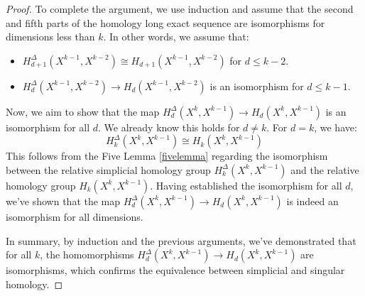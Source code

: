 \begin{proof}
To complete the argument, we use induction and assume that the second and fifth parts of the homology long exact sequence are isomorphisms for dimensions less than $k$. In other words, we assume that:
\begin{itemize}
	\item $H_{d+1}^\Delta(X^{k-1}, X^{k-2}) \cong H_{d+1}(X^{k-1}, X^{k-2})$ for $d \leq k-2$.
	\item $H_d^\Delta(X^{k-1}, X^{k-2}) \rightarrow H_d(X^{k-1}, X^{k-2})$ is an isomorphism for $d \leq k-1$.
\end{itemize}
Now, we aim to show that the map $H_d^\Delta(X^k, X^{k-1}) \rightarrow H_d(X^k, X^{k-1})$ is an isomorphism for all $d$. We already know this holds for $d \neq k$. For $d = k$, we have:
\begin{equation}
H_k^\Delta(X^k,X^{k-1}) \cong H_k(X^k,X^{k-1})
\end{equation}
This follows from the Five Lemma \ref{fivelemma} regarding the isomorphism between the relative simplicial homology group $H_k^\Delta(X^k, X^{k-1})$ and the relative homology group $H_k(X^k, X^{k-1})$. Having established the isomorphism for all $d$, we've shown that the map 
$H_d^\Delta(X^k, X^{k-1}) \rightarrow H_d(X^k, X^{k-1})$ is indeed an isomorphism for all dimensions.

In summary, by induction and the previous arguments, we've demonstrated that for all $k$, the homomorphisms $H_d^\Delta(X^k, X^{k-1}) \rightarrow H_d(X^k, X^{k-1})$ are isomorphisms, which confirms the equivalence between simplicial and singular homology.
\end{proof}


